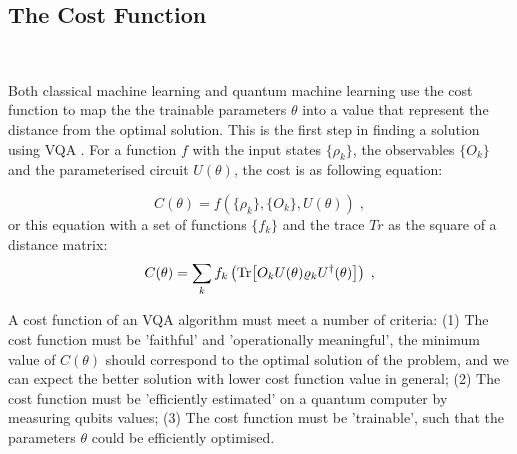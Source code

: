 \subsection{The Cost Function} \label{Sec: The Cost Function}\


Both classical machine learning and quantum machine learning use the cost function to map the the trainable parameters $\theta$ into a value that represent the distance from the optimal solution.
This is the first step in finding a solution using VQA \cite{cerezo_variational_2021}.
For a function $f$ with the input states $\{\rho_k\}$, the observables $\{O_k\}$ and the parameterised circuit $U(\theta)$, the cost is as following equation:

\begin{equation}
    C(\theta) = f(\{\rho_k\}, \{O_k\}, U(\theta)) \;,
\end{equation}
or this equation with a set of functions $\{f_k\}$ and the trace $Tr$ as the square of a distance matrix:
\begin{equation}
    C(\theta) = \sum_k f_k \left(\Tr[ O_k U(\theta) \varrho_k U^\dagger(\theta) ]\right) \;,
    \label{Eqn: Cost function}
\end{equation}

A cost function of an VQA algorithm must meet a number of criteria:
(1) The cost function must be 'faithful' and 'operationally meaningful', the minimum value of $C(\theta)$ should correspond to the optimal solution of the problem, and we can expect the better solution with lower cost function value in general;
(2) The cost function must be 'efficiently estimated' on a quantum computer by measuring qubits values;
(3) The cost function must be 'trainable', such that the parameters $\theta$ could be efficiently optimised.